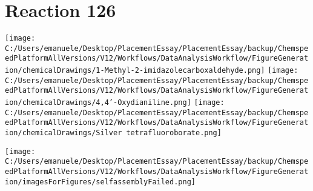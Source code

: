 \documentclass{article}%
\begin{document}
\section*{Reaction 126}%
%
\begin{scheme}[H]%
\begin{minipage}{0.5\textwidth}%
\texttt{[image: C:/Users/emanuele/Desktop/PlacementEssay/PlacementEssay/backup/ChemspeedPlatformAllVersions/V12/Workflows/DataAnalysisWorkflow/FigureGeneration/chemicalDrawings/1-Methyl-2-imidazolecarboxaldehyde.png]}%
\texttt{[image: C:/Users/emanuele/Desktop/PlacementEssay/PlacementEssay/backup/ChemspeedPlatformAllVersions/V12/Workflows/DataAnalysisWorkflow/FigureGeneration/chemicalDrawings/4,4'-Oxydianiline.png]}%
\texttt{[image: C:/Users/emanuele/Desktop/PlacementEssay/PlacementEssay/backup/ChemspeedPlatformAllVersions/V12/Workflows/DataAnalysisWorkflow/FigureGeneration/chemicalDrawings/Silver tetrafluoroborate.png]}%
\end{minipage}%
\begin{minipage}{0.5\textwidth}%
\begin{center}%
\texttt{[image: C:/Users/emanuele/Desktop/PlacementEssay/PlacementEssay/backup/ChemspeedPlatformAllVersions/V12/Workflows/DataAnalysisWorkflow/FigureGeneration/imagesForFigures/selfassemblyFailed.png]}%
\end{center}%
\end{minipage}%
\caption{Self-assembly of components 12, 15, with Silver(I) in a 3.0:1.5:1.0 molar ratio in CH$_3$CN at 60\textdegree C for 40h. These are the reagents (starting materials) for reaction 126.}%
\end{scheme}%
\end{document}
